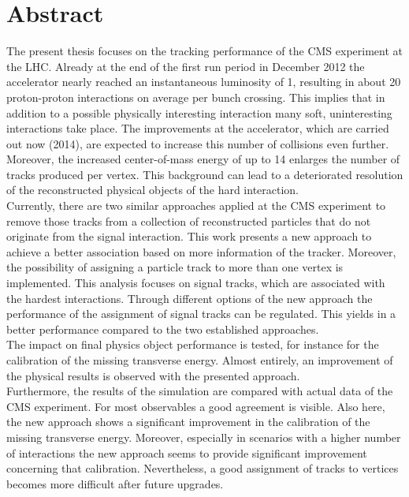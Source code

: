 \chapter*{Abstract}

The present thesis focuses on the tracking performance of the CMS experiment at the LHC. Already at the end of the first run period in December 2012 the accelerator nearly reached an  instantaneous luminosity of 1\percms{}, resulting in about 20 proton-proton interactions on average per bunch crossing. This implies that in addition to a possible physically interesting interaction many soft, uninteresting interactions take place. The improvements at the accelerator, which are carried out now (2014), are expected to increase this number of collisions even further. Moreover, the increased center-of-mass energy of up to 14\TeV{} enlarges the number of tracks produced per vertex. This background can lead to a deteriorated resolution of the reconstructed physical objects of the hard interaction.\\
Currently, there are two similar approaches applied at the CMS experiment to remove those tracks from a collection of reconstructed particles that do not originate from the signal interaction. This work presents a new approach to achieve a better association based on more information of the tracker. Moreover, the possibility of assigning a particle track to more than one vertex is implemented. This analysis focuses on signal tracks, which are associated with the hardest interactions. Through different options of the new approach the performance of the assignment of signal tracks can be regulated. This yields in a better performance compared to the two established approaches. \\
The impact on final physics object performance is tested, for instance for the calibration of the missing transverse energy. Almost entirely, an improvement of the physical results is observed with the presented approach. \\
Furthermore, the results of the simulation are compared with actual data of the CMS experiment. For most observables a good agreement is visible. Also here, the new approach shows a significant improvement in the calibration of the missing transverse energy. Moreover, especially in scenarios with a higher number of interactions the new approach seems to provide significant improvement concerning that calibration. Nevertheless, a good assignment of tracks to vertices becomes more difficult after future upgrades.
